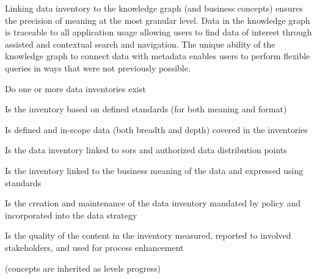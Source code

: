 %
%

\ekgmmCapabilitySectionContributionToEnterprise

Linking data inventory to the knowledge graph (and business concepts) ensures the precision of meaning at the most
granular level.
Data in the knowledge graph is traceable to all application usage allowing users to find data of interest through
assisted and contextual search and navigation.
The unique ability of the knowledge graph to connect data with metadata enables users to perform flexible queries
in ways that were not previously possible.

\ekgmmCapabilitySectionDimensions

\begin{core-questions}

  \item [\thesection.1] Do one or more data inventories exist
  \item [\thesection.2] Is the inventory based on defined standards (for both meaning and format)
  \item [\thesection.3] Is defined and in-scope data (both breadth and depth) covered in the inventories
  \item [\thesection.4] Is the data inventory linked to \glspl{sor} and authorized data distribution points
  \item [\thesection.5] Is the inventory linked to the business meaning of the data and expressed using standards
  \item [\thesection.6] Is the creation and maintenance of the data inventory mandated by policy and incorporated
                        into the data strategy
  \item [\thesection.7] Is the quality of the content in the inventory measured, reported to involved stakeholders,
                        and used for process enhancement

\end{core-questions}

\ekgmmCapabilitySectionLevelsOneFive

(concepts are inherited as levels progress)

\ekgmmscoringlevelOne

